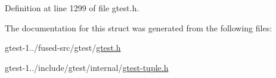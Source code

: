 \-Definition at line 1299 of file gtest.\-h.



\-The documentation for this struct was generated from the following files\-:\begin{DoxyCompactItemize}
\item 
gtest-\/1../fused-\/src/gtest/\hyperlink{fused-src_2gtest_2gtest_8h}{gtest.\-h}\item 
gtest-\/1../include/gtest/internal/\hyperlink{gtest-tuple_8h}{gtest-\/tuple.\-h}\end{DoxyCompactItemize}
